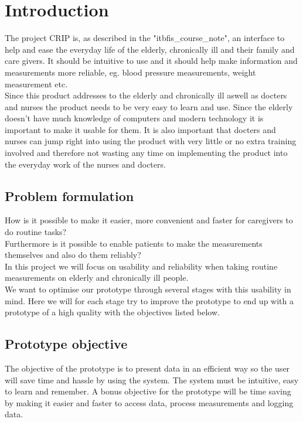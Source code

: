 \chapter{Introduction}
The project CRIP is, as described in the "itbfis\_course\_note", an interface to help and ease the everyday life of the elderly, chronically ill and their family and care givers. It should be intuitive to use and it should help make information and measurements more reliable, eg. blood pressure measurements, weight measurement  etc. \\
Since this product addresses to the elderly and chronically ill aswell as docters and nurses the product needs to be very easy to learn and use. Since the elderly doesn't have much knowledge of computers and modern technology it is important to make it usable for them. It is also important that docters and nurses can jump right into using the product with very little or no extra training involved and therefore not wasting any time on implementing the product into the everyday work of the nurses and docters.\\

\section{Problem formulation}
How is it possible to make it easier, more convenient and faster for caregivers to do routine tasks?\\
Furthermore is it possible to enable patients to make the measurements themselves and also do them reliably?\\
In this project we will focus on usability and reliability when taking routine measurements on elderly and chronically ill people.\\
We want to optimise our prototype through several stages with this usability in mind. Here we will for each stage try to improve the prototype to end up with a prototype of a high quality with the objectives listed below.\\


\section{Prototype objective}
The objective of the prototype is to present data in an efficient way so the user will save time and hassle by using the system. The system must be intuitive, easy to learn and remember. A bonus objective for the prototype will be time saving by making it easier and faster to access data, process measurements and logging data. 


